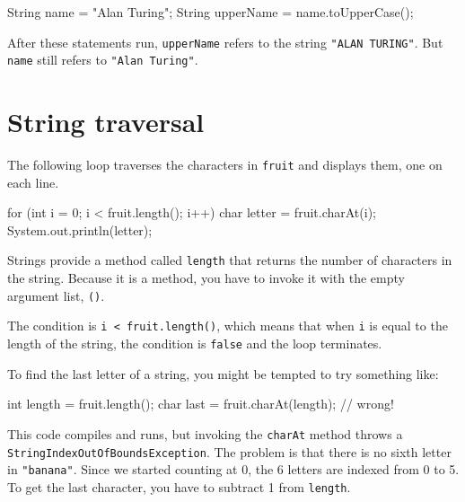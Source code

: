 \documentclass[12pt]{book}
\theoremstyle{exercise}
\newcommand{\java}[1]{\verb"#1"}
\begin{document}
\begin{code}
    String name = "Alan Turing";
    String upperName = name.toUpperCase();
\end{code}


After these statements run, \java{upperName} refers to the string \verb|"ALAN TURING"|.
But \java{name} still refers to \verb|"Alan Turing"|.


\section{String traversal}
\label{stringtraverse}


The following loop traverses the characters in \java{fruit} and displays them, one on each line.

\begin{code}
    for (int i = 0; i < fruit.length(); i++) {
        char letter = fruit.charAt(i);
        System.out.println(letter);
    }
\end{code}

Strings provide a method called \java{length} that returns the number of characters in the string.
Because it is a method, you have to invoke it with the empty argument list, \java{()}.


The condition is \java{i < fruit.length()}, which means that when \java{i} is equal to the length of the string, the condition is \java{false} and the loop terminates.




To find the last letter of a string, you might be tempted to try something like:

\begin{code}
    int length = fruit.length();
    char last = fruit.charAt(length);      // wrong!
\end{code}

This code compiles and runs, but invoking the \java{charAt} method throws a \java{StringIndexOutOfBoundsException}.
The problem is that there is no sixth letter in \verb|"banana"|.
Since we started counting at 0, the 6 letters are indexed from 0 to 5.
To get the last character, you have to subtract 1 from \java{length}.
\end{document}
